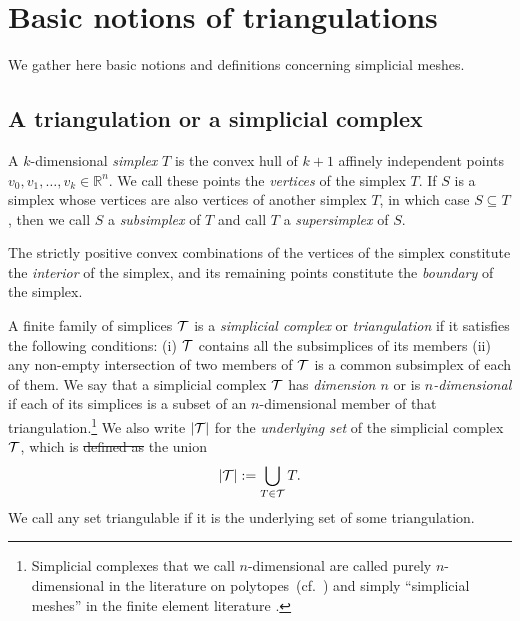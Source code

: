 \documentclass[10pt,a4paper]{article}
\newcommand\cye[1]{%
\protect\leavevmode
\begingroup
    \color{blue}%
    #1%
\endgroup
}
\begin{document}
\section{Basic notions of triangulations}\label{section:triangulations}

We gather here basic notions and definitions concerning simplicial meshes. 
  
\subsection{A triangulation or a simplicial complex}

A ${k}$-dimensional \emph{simplex} $T$ is the convex hull of ${k}+1$ affinely independent points $v_0, v_1, \ldots, v_{{k}} \in \mathbb{R}^{n}$. We call these points the \emph{vertices} of the simplex $T$. 
If $S$ is a simplex whose vertices are also vertices of another simplex $T$, in which case $S \subseteq T$, 
then we call $S$ a \textit{subsimplex} of $T$ and call $T$ a \textit{supersimplex} of $S$. 

The strictly positive convex combinations of the vertices of the simplex constitute the \textit{ interior} of the simplex,
and its remaining points constitute the \textit{boundary} of the simplex.

A finite family of simplices ${\mathcal T}$ is a \emph{simplicial complex} or \emph{triangulation} if it satisfies the following conditions: 
(i) ${\mathcal T}$ contains all the subsimplices of its members (ii) any non-empty intersection of two members of ${\mathcal T}$ is a common subsimplex of each of them. 
We say that a simplicial complex ${\mathcal T}$ has \textit{dimension $n$} or is \textit{$n$-dimensional} if each of its simplices is a subset of an $n$-dimensional member of that triangulation.\footnote{Simplicial complexes that we call $n$-dimensional are called purely $n$-dimensional in the literature on polytopes~(cf.\ \cite{ziegler1995lectures}) \cye{and simply ``simplicial meshes'' in the finite element literature}.} 
We also write $\left| {\mathcal T} \right|$ for the \textit{underlying set} of the simplicial complex ${\mathcal T}$, which is \sout{defined as} the union 
\begin{align*}
    \left| {\mathcal T} \right| := \bigcup_{ T \in {\mathcal T} } T
    .
\end{align*}
We call any set triangulable if it is the underlying set of some triangulation. 
\\
\end{document}
